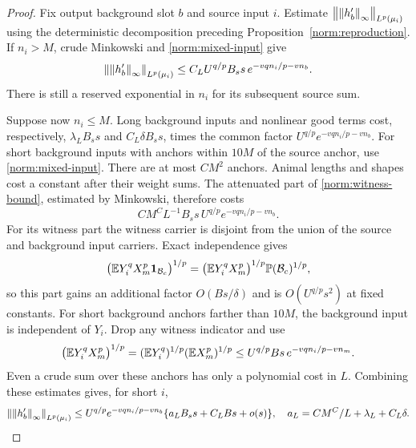 \begin{proof}
Fix output background slot $b$ and source input $i$.  Estimate
$\left\lVert\left\lVert h'_b\right\rVert_\infty\right\rVert_{L^p(\mu_i)}$ using the deterministic
decomposition preceding Proposition~\ref{norm:reproduction}.  If
$n_i>M$, crude Minkowski and \eqref{norm:mixed-input} give
\begin{equation}\label{norm:mixed-long-source}
 \left\lVert\left\lVert h'_b\right\rVert_\infty\right\rVert_{L^p(\mu_i)}
 \le C_L U^{q/p}B_s s\,e^{-vq n_i/p-vn_b}.
\end{equation}
There is still a reserved exponential in $n_i$ for its subsequent
source sum.

Suppose now $n_i\le M$.  Long background inputs and nonlinear good
terms cost, respectively, $\lambda_L B_s s$ and $C_L\delta B_s s$,
times the common factor $U^{q/p}e^{-vq n_i/p-vn_b}$.
For short background inputs with anchors within $10M$ of the source
anchor, use \eqref{norm:mixed-input}.  There are at most $CM^2$
anchors.  Animal lengths and shapes cost a constant after their weight
sums.  The attenuated part of \eqref{norm:witness-bound}, estimated
by Minkowski, therefore costs
\[
       C M^C L^{-1} B_s s\,
                  U^{q/p}e^{-vq n_i/p-vn_b}.
\]
For its witness part the witness carrier is disjoint from the union
of the source and background input carriers.  Exact independence gives
\[
 \big(\mathbb E Y_i^q X_m^p\mathbf 1_{\mathcal B_c}\big)^{1/p}
   =\big(\mathbb E Y_i^qX_m^p\big)^{1/p}\mathbb P(\mathcal B_c)^{1/p},
\]
so this part gains an additional factor $O(Bs/\delta)$ and is
$O(U^{q/p}s^2)$ at fixed constants.  For short background anchors
farther than $10M$, the background input is independent of $Y_i$.
Drop any witness indicator and use
\[
 \big(\mathbb E Y_i^qX_m^p\big)^{1/p}
       = (\mathbb E Y_i^q)^{1/p}(\mathbb E X_m^p)^{1/p}
       \le U^{q/p} Bs\,e^{-vq n_i/p-vn_m}.
\]
Even a crude sum over these anchors has only a polynomial cost in $L$.
Combining these estimates gives, for short $i$,
\begin{equation}\label{norm:mixed-fixed-source}
 \left\lVert\left\lVert h'_b\right\rVert_\infty\right\rVert_{L^p(\mu_i)}
 \le U^{q/p}e^{-vq n_i/p-vn_b}
       \{a_LB_s s+C_LBs+o(s)\},
 \quad a_L=C M^C/L+\lambda_L+C_L\delta.
\end{equation}


\end{proof}
